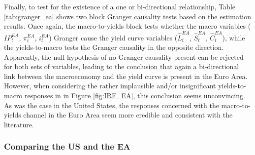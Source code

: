 Finally, to test for the existence of a one or bi-directional relationship, Table \ref{tab:granger_ea} shows two block Granger causality tests based on the estimation results. 
Once again, the macro-to-yields block tests whether the macro variables ($IP^{EA}_{t}$, $\pi^{EA}_{t}$, $i^{EA}_{t}$) Granger cause the yield curve variables ($\hat{L}^{EA}_{t}$, $\hat{S}^{EA}_{t}$, $\hat{C}^{EA}_{t}$), while the yields-to-macro tests the Granger causality in the opposite direction. 
Apparently, the null hypothesis of no Granger causality present can be rejected for both sets of variables,
leading to the conclusion that again a bi-directional link between the macroeconomy and the yield curve is present in the Euro Area. 
However, when considering the rather implausible and/or insignificant yields-to-macro responses in in Figure \ref{fig:IRF_EA}, this conclusion seems unconvincing. 
As was the case in the United States, the responses concerned with the macro-to-yields channel in the Euro Area seem more credible and consistent with the literature. 

\subsubsection{Comparing the US and the EA}
\label{sec:comparison}











